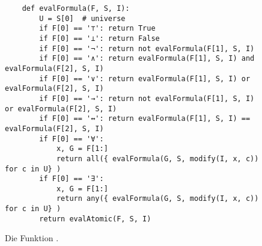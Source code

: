 \begin{figure}[!ht]
\centering
\begin{verbatim}
    def evalFormula(F, S, I):
        U = S[0]  # universe
        if F[0] == '⊤': return True
        if F[0] == '⊥': return False
        if F[0] == '¬': return not evalFormula(F[1], S, I)
        if F[0] == '∧': return evalFormula(F[1], S, I) and evalFormula(F[2], S, I)
        if F[0] == '∨': return evalFormula(F[1], S, I) or evalFormula(F[2], S, I)
        if F[0] == '→': return not evalFormula(F[1], S, I) or evalFormula(F[2], S, I)
        if F[0] == '↔': return evalFormula(F[1], S, I) == evalFormula(F[2], S, I)
        if F[0] == '∀': 
            x, G = F[1:] 
            return all({ evalFormula(G, S, modify(I, x, c)) for c in U} )
        if F[0] == '∃':
            x, G = F[1:] 
            return any({ evalFormula(G, S, modify(I, x, c)) for c in U} )
        return evalAtomic(F, S, I)                   
\end{verbatim}
\vspace*{-0.3cm}
\caption{Die Funktion .}
\label{fig:evalFormula.ipynb}
\end{figure}

